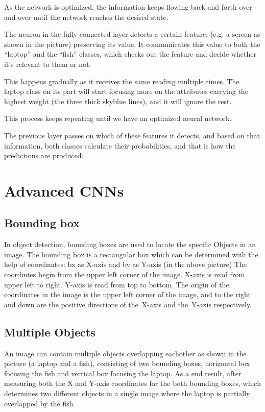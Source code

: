 \documentclass[a4paper,13pt,twoside]{book}
\begin{document}
As the network is optimized, the information keeps flowing back and forth over and over until the network reaches the desired state.

The neuron in the fully-connected layer detects a certain feature, (e.g. a screen as shown in the picture) preserving its value.
It communicates this value to both the “laptop” and the “fish” classes, which checks out the feature and decide whether it's relevant to them or not.

This happens gradually as it receives the same reading multiple times. The laptop class on its part will start focusing more on the attributes carrying the highest weight (the three thick skyblue lines), and it will ignore the rest.

This process keeps repeating until we have an optimized neural network.

The previous layer passes on which of these features it detects, and based on that information, both classes calculate their probabilities, and that is how the predictions are produced.

\chapter{Advanced CNNs}

\section{Bounding box}

In object detection, bounding boxes are used to locate the specific Objects in an image. The bounding box is a rectangular box which can be determined with the help of coordinates:
bx as X-axis and by as Y-axis (in the above picture)
The coordintes begin from the upper left corner of the image.
X-axis is read from upper left to right.
Y-axis is read from top to bottom.
The origin of the coordinates in the image is the upper left corner of the image, and to the right and down are the positive directions of the X-axis and the Y-axis respectively.

\section{Multiple Objects}

An image can contain multiple objects overlapping eachother as shown in the picture (a laptop and a fish), consisting of two bounding boxes, horizontal box focusing the fish and vertical box focusing the laptop.
As a end result, after measuring both the X and Y-axis coordinates for the both bounding boxes, which determines two different objects in a single image where the laptop is partially overlapped by the fish.
\end{document}
